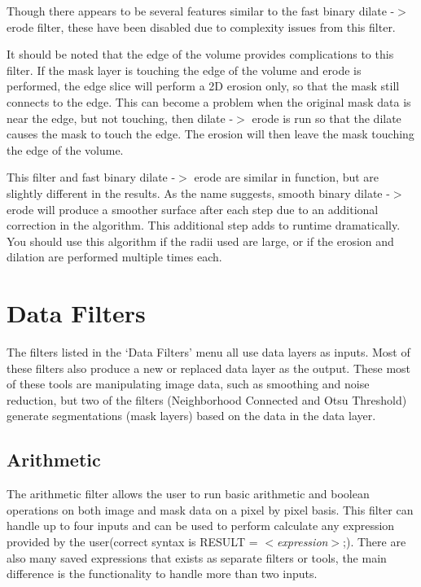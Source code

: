 \documentclass[fleqn,11pt,openany]{book}
\begin{document}
Though there appears to be several features similar to the fast binary dilate -$>$ erode filter, these have been disabled due to complexity issues from this filter.

It should be noted that the edge of the volume provides complications to this filter.  If the mask layer is touching the edge of the volume and erode is performed, the edge slice will perform a 2D erosion only, so that the mask still connects to the edge.  This can  become a problem when the original mask data is near the edge, but not touching, then dilate -$>$ erode is run so that the dilate causes the mask to touch the edge.  The erosion will then leave the mask touching the edge of the volume.

This filter and fast binary dilate -$>$ erode are similar in function, but are slightly different in the results.  As the name suggests, smooth binary dilate -$>$ erode will produce a smoother surface after each step due to an additional correction in the algorithm.  This additional step adds to runtime dramatically.  You should use this algorithm if the radii used are large, or if the erosion and dilation are performed multiple times each.  

\section{Data Filters}

The filters listed in the `Data Filters' menu all use data layers as inputs.  Most of these filters also produce a new or replaced data layer as the output.  These most of these tools are manipulating image data, such as smoothing and noise reduction, but two of the filters (Neighborhood Connected and Otsu Threshold) generate segmentations (mask layers) based on the data in the data layer.  

\subsection{Arithmetic}

The arithmetic filter allows the user to run basic arithmetic and boolean operations on both image and mask data on a pixel by pixel basis.  This filter can handle up to four inputs and can be used to perform calculate any expression provided by the user(correct syntax is RESULT = \emph{$<$expression$>$};).  There are also many saved expressions that exists as separate filters or tools, the main difference is the functionality to handle more than two inputs.
\end{document}
